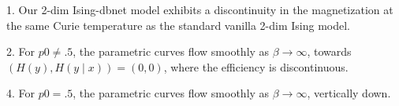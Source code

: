 1. Our 2-dim Ising-dbnet model exhibits a discontinuity in the magnetization at the same Curie temperature as the standard vanilla 2-dim Ising model.

2. For $p0\neq .5$, the parametric curves flow smoothly as $\beta\rightarrow \infty$, towards $(H(y), H(y\mid x))=(0,0)$, where the efficiency is discontinuous.

4. For $p0=.5$, the parametric curves flow smoothly as $\beta\rightarrow \infty$, vertically down.